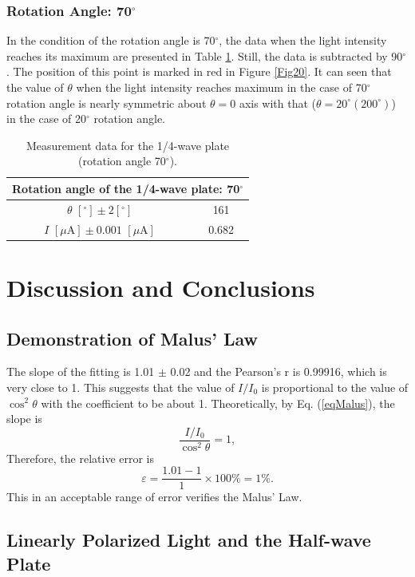 \documentclass{article}
\begin{document}
\subsubsection{Rotation Angle: 70$^\circ$}

In the condition of the rotation angle is 70$^\circ$, the data when the light intensity reaches its maximum are presented in Table \ref{Table70}. Still, the data is subtracted by 90$^\circ$. The position of this point is marked in red in Figure \ref{Fig20}. It can seen that the value of $\theta$ when the light intensity reaches maximum in the case of 70$^\circ$ rotation angle is nearly symmetric about $\theta = 0$ axis with that ($\theta = 20^\circ (200^\circ)$) in the case of 20$^\circ$ rotation angle. 

\begin{table}[H]\centering
\begin{tabular}{cc}
\toprule
\multicolumn{2}{c}{Rotation angle of the 1/4-wave plate: 70$^\circ$}\\
\midrule
$\theta\,\,[^\circ] \pm 2[^\circ]$ & 161 \\
$I\,\,[\mu\text{A}] \pm 0.001\,\,[\mu\text{A}]$ & 0.682 \\
\bottomrule
\end{tabular}
\caption{Measurement data for the 1/4-wave plate (rotation angle 70$^\circ$).}\label{Table70}
\end{table}

\section{Discussion and Conclusions}

\subsection{Demonstration of Malus' Law}

The slope of the fitting is 1.01 $\pm$ 0.02 and the Pearson's r is 0.99916, which is very close to 1. This suggests that the value of $I/I_0$ is proportional to the value of $\cos^2\theta$ with the coefficient to be about 1. Theoretically, by Eq. (\ref{eqMalus}), the slope is
$$\frac{I/I_0}{\cos^2\theta} = 1,$$
Therefore, the relative error is
$$\varepsilon = \frac{1.01-1}{1} \times 100\% = 1\%.$$
This in an acceptable range of error verifies the Malus' Law.

\subsection{Linearly Polarized Light and the Half-wave Plate}
\end{document}
